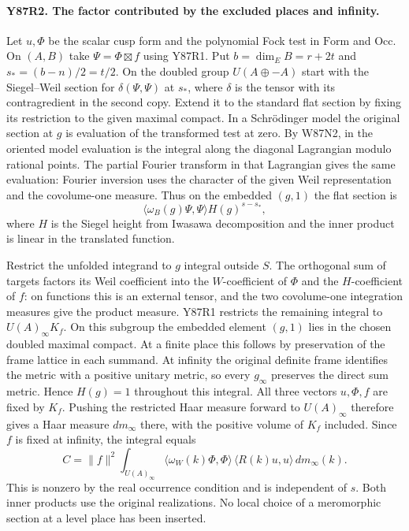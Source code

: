 \paragraph{Y87R2. The factor contributed by the excluded places and infinity.}
Let $u,\Phi$ be the scalar cusp form and the polynomial Fock test in
$\mathrm{Form}$ and $\mathrm{Occ}$. On $(A,B)$ take
$\Psi=\Phi\boxtimes f$ using Y87R1. Put $b=\dim_E B=r+2t$ and
$s_*=(b-n)/2=t/2$. On the doubled group $U(A\oplus-A)$ start with
the Siegel--Weil section for $\delta(\Psi,\Psi)$ at $s_*$, where
$\delta$ is the tensor with its contragredient in the second copy.
Extend it to the standard flat section by fixing its restriction to
the given maximal compact. In a Schr\"odinger model the original
section at $g$ is evaluation of the transformed test at zero.
By W87N2, in the oriented model evaluation is the integral along the diagonal
Lagrangian modulo rational points. The partial Fourier transform in
that Lagrangian gives the same evaluation: Fourier inversion uses
the character of the given Weil representation and the
covolume-one measure. Thus on the embedded $(g,1)$ the flat section is
\[
  \langle\omega_B(g)\Psi,\Psi\rangle
                  H(g)^{s-s_*},
\]
where $H$ is the Siegel height from Iwasawa decomposition and the
inner product is linear in the translated function.

Restrict the unfolded integrand to $g$ integral outside $S$. The
orthogonal sum of targets factors its Weil coefficient into the
$W$-coefficient of $\Phi$ and the $H$-coefficient of $f$: on
functions this is an external tensor, and the two covolume-one
integration measures give the product measure. Y87R1 restricts the
remaining integral to $U(A)_\infty K_f$. On this subgroup the
embedded element $(g,1)$ lies in the chosen doubled maximal compact.
At a finite place this follows by preservation of the frame lattice
in each summand. At infinity the original definite frame identifies
the metric with a positive unitary metric, so every $g_\infty$
preserves the direct sum metric. Hence $H(g)=1$ throughout this
integral. All three vectors $u,\Phi,f$ are fixed by $K_f$. Pushing
the restricted Haar measure forward to $U(A)_\infty$ therefore
gives a Haar measure $dm_\infty$ there, with the positive volume of
$K_f$ included. Since $f$ is fixed at infinity, the integral equals
\[
  C=\|f\|^2\int_{U(A)_\infty}
   \langle\omega_W(k)\Phi,\Phi\rangle\,
   \langle R(k)u,u\rangle\,dm_\infty(k).
\]
This is nonzero by the real occurrence condition and is independent
of $s$. Both inner products use the original realizations. No local
choice of a meromorphic section at a level place has been inserted.

